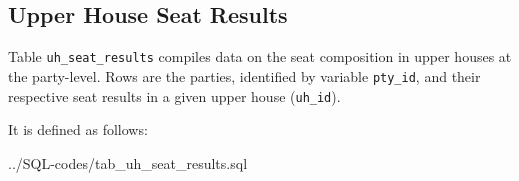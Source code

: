 \subsection{Upper House Seat Results}\label{subsec_tab_uh_seat_results}
Table  \texttt{\footnotesize uh\_seat\_results} compiles data on the seat composition in upper houses at the party-level. 
Rows are the parties, identified by variable \texttt{\footnotesize pty\_id}, and their respective seat results in a given upper house (\texttt{\footnotesize uh\_id}).


It is defined as follows: 

%
{../SQL-codes/tab_uh_seat_results.sql}

